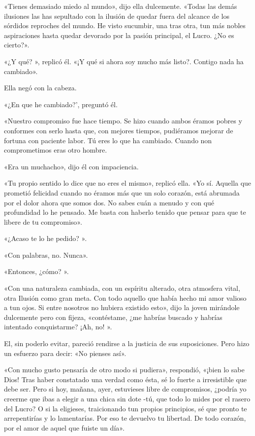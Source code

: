 \documentclass{novela}
\begin{document}
 «Tienes demasiado miedo al mundo», dijo ella dulcemente. «Todas las demás ilusiones las has sepultado con la ilusión de quedar fuera del alcance de los sórdidos reproches del mundo. He visto sucumbir, una tras otra, tun más nobles aspiraciones hasta quedar devorado por la pasión principal, el Lucro. ¿No es cierto?».

 «¿Y qué? », replicó él. «¡Y qué si ahora soy mucho más listo?. Contigo nada ha cambiado».

 Ella negó con la cabeza.

 «¿En que he cambiado?', preguntó él.

 «Nuestro compromiso fue hace tiempo. Se hizo cuando ambos éramos pobres y conformes con serlo hasta que, con mejores tiempos, pudiéramos mejorar de fortuna con paciente labor. Tú eres lo que ha cambiado. Cuando non comprometimos eras otro hombre.

 «Era un muchacho», dijo él con impaciencia.

 «Tu propio sentido lo dice que no eres el mismo», replicó ella. «Yo sí. Aquella que prometió felicidad cuando no éramos más que un solo corazón, está abrumada por el dolor ahora que somos dos. No sabes cuán a menudo y con qué profundidad lo he pensado. Me basta con haberlo tenido que pensar para que te libere de tu compromiso».

 «¿Acaso te lo he pedido? ».

 «Con palabras, no. Nunca».

 «Entonces, ¿cómo? ».

 «Con una naturaleza cambiada, con un espíritu alterado, otra atmosfera vital, otra Ilusión como gran meta. Con todo aquello que había hecho mi amor valioso a tun ojos. Si entre nosotros no hubiera existido esto», dijo la joven mirándole dulcemente pero con fijeza, «contéstame, ¿me habrías buscado y habrías intentado conquistarme? ¡Ah, no! ».

 El, sin poderlo evitar, pareció rendirse a la justicia de sus suposiciones. Pero hizo un esfuerzo para decir: «No pienses así».

 «Con mucho gusto pensaría de otro modo si pudiera», respondió, «¡bien lo sabe Dios! Tras haber constatado una verdad como ésta, sé lo fuerte a irresistible que debe ser. Pero si hoy, mañana, ayer, estuvieses libre de compromisos, ¿podría yo creerme que ibas a elegir a una chica sin dote -tú, que todo lo mides por el rasero del Lucro? O si la eligieses, traicionando tun propios principios, sé que pronto te arrepentirías y lo lamentarías. Por eso te devuelvo tu libertad. De todo corazón, por el amor de aquel que fuiste un día».
\end{document}
